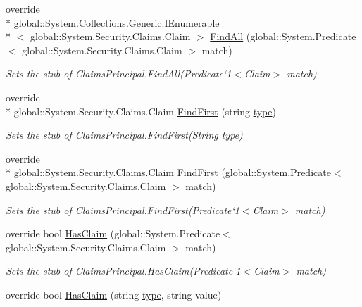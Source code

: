 \begin{DoxyCompactItemize}
override \\*
global\-::\-System.\-Collections.\-Generic.\-I\-Enumerable\\*
$<$ global\-::\-System.\-Security.\-Claims.\-Claim $>$ \hyperlink{class_system_1_1_security_1_1_principal_1_1_fakes_1_1_stub_generic_principal_a18fc84a0d90e672e5e8f0f6ae645d1e8}{Find\-All} (global\-::\-System.\-Predicate$<$ global\-::\-System.\-Security.\-Claims.\-Claim $>$ match)
\begin{DoxyCompactList}\small\item\em Sets the stub of Claims\-Principal.\-Find\-All(Predicate`1$<$Claim$>$ match)\end{DoxyCompactList}\item 
override \\*
global\-::\-System.\-Security.\-Claims.\-Claim \hyperlink{class_system_1_1_security_1_1_principal_1_1_fakes_1_1_stub_generic_principal_aa281a37c9ad1afe1f7dd138ea1b38d56}{Find\-First} (string \hyperlink{jquery-1_810_82-vsdoc_8js_a3940565e83a9bfd10d95ffd27536da91}{type})
\begin{DoxyCompactList}\small\item\em Sets the stub of Claims\-Principal.\-Find\-First(\-String type)\end{DoxyCompactList}\item 
override \\*
global\-::\-System.\-Security.\-Claims.\-Claim \hyperlink{class_system_1_1_security_1_1_principal_1_1_fakes_1_1_stub_generic_principal_ac2e6e826cef951febbe81c3fbbe3f67d}{Find\-First} (global\-::\-System.\-Predicate$<$ global\-::\-System.\-Security.\-Claims.\-Claim $>$ match)
\begin{DoxyCompactList}\small\item\em Sets the stub of Claims\-Principal.\-Find\-First(Predicate`1$<$Claim$>$ match)\end{DoxyCompactList}\item 
override bool \hyperlink{class_system_1_1_security_1_1_principal_1_1_fakes_1_1_stub_generic_principal_a3be27894a316d5c8e87f93a1ab7e3f06}{Has\-Claim} (global\-::\-System.\-Predicate$<$ global\-::\-System.\-Security.\-Claims.\-Claim $>$ match)
\begin{DoxyCompactList}\small\item\em Sets the stub of Claims\-Principal.\-Has\-Claim(Predicate`1$<$Claim$>$ match)\end{DoxyCompactList}\item 
override bool \hyperlink{class_system_1_1_security_1_1_principal_1_1_fakes_1_1_stub_generic_principal_a1d3f5b6358b58920af9055d604cd3812}{Has\-Claim} (string \hyperlink{jquery-1_810_82-vsdoc_8js_a3940565e83a9bfd10d95ffd27536da91}{type}, string value)

\end{DoxyCompactItemize}
